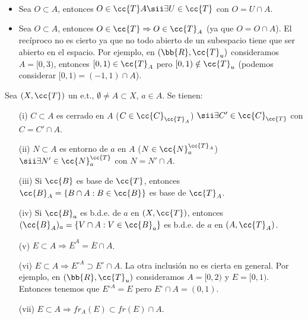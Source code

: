 \begin{observacion}\
    \begin{itemize}
        \item Sea $O\subset A$, entonces $O \in \cc{T}A \sii \exists U \in \cc{T}$ con $O=U\cap A$.
        \item Sea $O \subset A$, entonces $O\in \cc{T} \Rightarrow O \in \cc{T}_A$ (ya que $O=O\cap A$). El recíproco no es cierto ya que no todo abierto de un subespacio tiene que ser abierto en el espacio. Por ejemplo, en $(\bb{R}, \cc{T}_u)$ consideramos $A=[0,3)$, entonces $[0,1)\in \cc{T}_A$ pero $[0,1)\notin \cc{T}_u$ (podemos considerar $[0,1) = (-1,1)\cap A$).
    \end{itemize}
    \endsquare
\end{observacion}

\begin{prop}
    Sea $(X, \cc{T})$ un e.t., $\emptyset \neq A \subset X$, $a\in A$. Se tienen:
    \begin{enumerate}
        \item[(i)] $C\subset A$ es cerrado en $A$ ($C\in \cc{C}_{\cc{T}_A}$) $\sii \exists C' \in \cc{C}_{\cc{T}}$ con $C=C'\cap A$.
        \item[(ii)]  $N\subset A$ es entorno de $a$ en $A$ ($N \in \cc{N}_a^{\cc{T}_A}$) $\sii \exists N' \in \cc{N}_a^{\cc{T}}$ con $N=N'\cap A$.
        \item[(iii)] Si $\cc{B}$ es base de $\cc{T}$, entonces $\cc{B}_A = \{B\cap A : B \in \cc{B}\}$ es base de $\cc{T}_A$.
        \item[(iv)] Si $\cc{B}_a$ es b.d.e. de $a$ en $(X, \cc{T})$, entonces $(\cc{B}_A)_a = \{V\cap A : V\in \cc{B}_a\}$ es b.d.e. de $a$ en $(A, \cc{T}_A)$.
        \item[(v)] $E\subset A \Rightarrow \overline{E}^A = \overline{E}\cap A$.
        \item[(vi)] $E\subset A \Rightarrow E^{\circ A} \supset E^\circ \cap A$. La otra inclusión no es cierta en general. Por ejemplo, en $(\bb{R}, \cc{T}_u)$ consideramos $A=[0,2)$ y $E=[0,1)$. Entonces tenemos que $E^{\circ A} = E$ pero $E^\circ \cap A = (0,1)$.
        \item[(vii)] $E\subset A \Rightarrow fr_A(E)\subset fr(E)\cap A$.  
    \end{enumerate}


\end{prop}
